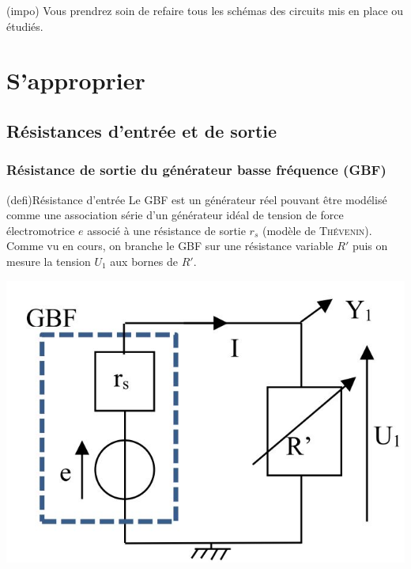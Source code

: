 \documentclass[../main/main.tex]{subfiles}
\begin{document}
\begin{tcb}[cnt](impo){}
	Vous prendrez soin de refaire tous les schémas des circuits mis en place ou
	étudiés.
\end{tcb}

\section{S'approprier}
\subsection{Résistances d'entrée et de sortie}


\subsubsection{Résistance de sortie du générateur basse fréquence (GBF)}

\begin{tcb}[sidebyside, righthand ratio=.35](defi){Résistance d'entrée}
	Le GBF est un générateur réel pouvant être modélisé comme une association
	série d'un générateur idéal de tension de force électromotrice $e$ associé à
	une résistance de sortie $r_{s}$ (modèle de \textsc{Thévenin}). Comme vu en
	cours, on branche le GBF sur une résistance variable $R'$ puis on mesure la
	tension $U_1$ aux bornes de $R'$.
	\tcblower
	\begin{center}
		\includegraphics[width=\linewidth]{res_entree}
	\end{center}
\end{tcb}
\end{document}
